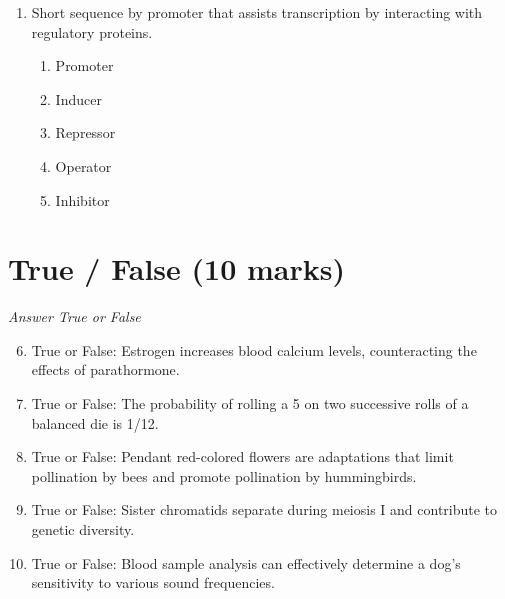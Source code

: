 \documentclass[12pt]{article}
\begin{document}
\begin{enumerate}[label=\arabic*.]
\begin{enumerate}[label=(\alph*)]
    \item Smaller cells are more resilient to external damage.
    \item Smaller cells have a larger number of organelles.
    \item Smaller cells require less energy to function.
    \item Smaller cells can multiply faster.
    \item Smaller cells fit together more tightly.
\end{enumerate}
\item Short sequence by promoter that assists transcription by interacting with regulatory proteins.
\begin{enumerate}[label=(\alph*)]
    \item Promoter
    \item Inducer
    \item Repressor
    \item Operator
    \item Inhibitor
\end{enumerate}
\end{enumerate}

\section*{True / False (10 marks)}
\textit{Answer True or False}
\begin{enumerate}[label=\arabic*.]
\setcounter{enumi}{5}
\item True or False: Estrogen increases blood calcium levels, counteracting the effects of parathormone.
\item True or False: The probability of rolling a 5 on two successive rolls of a balanced die is 1/12.
\item True or False: Pendant red-colored flowers are adaptations that limit pollination by bees and promote pollination by hummingbirds.
\item True or False: Sister chromatids separate during meiosis I and contribute to genetic diversity.
\item True or False: Blood sample analysis can effectively determine a dog's sensitivity to various sound frequencies.
\end{enumerate}
\end{document}

